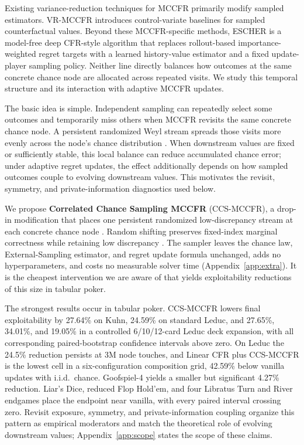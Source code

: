 \documentclass[11pt]{article}
\begin{document}
Existing variance-reduction techniques for MCCFR primarily modify sampled estimators. VR-MCCFR \cite{schmid2019variance} introduces control-variate baselines for sampled counterfactual values. Beyond these MCCFR-specific methods, ESCHER \cite{mcaleer2023escher} is a model-free deep CFR-style algorithm that replaces rollout-based importance-weighted regret targets with a learned history-value estimator and a fixed update-player sampling policy. Neither line directly balances how outcomes at the same concrete chance node are allocated across repeated visits. We study this temporal structure and its interaction with adaptive MCCFR updates.

The basic idea is simple. Independent sampling can repeatedly select some outcomes and temporarily miss others when MCCFR revisits the same concrete chance node. A persistent randomized Weyl stream spreads those visits more evenly across the node's chance distribution \citep{niederreiter1992random}. When downstream values are fixed or sufficiently stable, this local balance can reduce accumulated chance error; under adaptive regret updates, the effect additionally depends on how sampled outcomes couple to evolving downstream values. This motivates the revisit, symmetry, and private-information diagnostics used below.

We propose \textbf{Correlated Chance Sampling MCCFR} (CCS-MCCFR), a drop-in modification that places one persistent randomized low-discrepancy stream at each concrete chance node \citep{niederreiter1992random}. Random shifting preserves fixed-index marginal correctness while retaining low discrepancy \citep{cranley1976randomization,owen1997monte}. The sampler leaves the chance law, External-Sampling estimator, and regret update formula unchanged, adds no hyperparameters, and costs no measurable solver time (Appendix~\ref{app:extra}). It is the cheapest intervention we are aware of that yields exploitability reductions of this size in tabular poker.

The strongest results occur in tabular poker. CCS-MCCFR lowers final exploitability by 27.64\% on Kuhn, 24.59\% on standard Leduc, and 27.65\%, 34.01\%, and 19.05\% in a controlled 6/10/12-card Leduc deck expansion, with all corresponding paired-bootstrap confidence intervals above zero. On Leduc the 24.5\% reduction persists at 3M node touches, and Linear CFR plus CCS-MCCFR is the lowest cell in a six-configuration composition grid, 42.59\% below vanilla updates with i.i.d.\ chance. Goofspiel-4 yields a smaller but significant 4.27\% reduction. Liar's Dice, reduced Flop Hold'em, and four Libratus Turn and River endgames place the endpoint near vanilla, with every paired interval crossing zero. Revisit exposure, symmetry, and private-information coupling organize this pattern as empirical moderators and match the theoretical role of evolving downstream values; Appendix~\ref{app:scope} states the scope of these claims.
\end{document}

